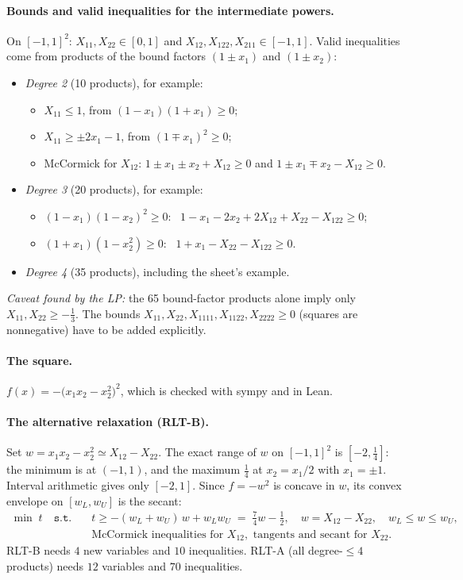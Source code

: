 \documentclass[11pt,fleqn]{article}
\newcommand{\st}{\texttt{s.t.}}
\begin{document}
\paragraph{Bounds and valid inequalities for the intermediate powers.}
On $[-1,1]^2$:
$X_{11}, X_{22} \in [0,1]$ and $X_{12}, X_{122}, X_{211} \in [-1,1]$.
Valid inequalities come from products of the bound factors $(1\pm x_1)$ and $(1\pm x_2)$:
\begin{itemize}
\item \emph{Degree 2} (10 products), for example:
  \begin{itemize}
  \item $X_{11} \le 1$, from $(1-x_1)(1+x_1)\ge0$;
  \item $X_{11} \ge \pm 2x_1 - 1$, from $(1\mp x_1)^2\ge0$;
  \item McCormick for $X_{12}$: $1 \pm x_1 \pm x_2 + X_{12} \ge 0$ and $1 \pm x_1 \mp x_2 - X_{12} \ge 0$.
  \end{itemize}
\item \emph{Degree 3} (20 products), for example:
  \begin{itemize}
  \item $(1-x_1)(1-x_2)^2 \ge 0$: \ $1 - x_1 - 2x_2 + 2X_{12} + X_{22} - X_{122} \ge 0$;
  \item $(1+x_1)(1-x_2^2) \ge 0$: \ $1 + x_1 - X_{22} - X_{122} \ge 0$.
  \end{itemize}
\item \emph{Degree 4} (35 products), including the sheet's example.
\end{itemize}

\emph{Caveat found by the LP:} the 65 bound-factor products alone imply only
$X_{11}, X_{22} \ge -\tfrac13$. The bounds $X_{11}, X_{22}, X_{1111}, X_{1122}, X_{2222} \ge 0$
(squares are nonnegative) have to be added explicitly.

\paragraph{The square.}
$f(x) = -\big(x_1x_2 - x_2^2\big)^2$, which is checked with sympy and in Lean.

\paragraph{The alternative relaxation (RLT-B).}
Set $w = x_1x_2 - x_2^2 \simeq X_{12} - X_{22}$. The exact range of $w$ on $[-1,1]^2$ is
$[-2, \tfrac14]$: the minimum is at $(-1,1)$, and the maximum $\tfrac14$ at $x_2 = x_1/2$
with $x_1 = \pm1$. Interval arithmetic gives only $[-2,1]$. Since $f = -w^2$ is concave in
$w$, its convex envelope on $[w_L,w_U]$ is the secant:
\begin{align*}
  \min\; t \quad\st\quad & t \ge -(w_L+w_U)\,w + w_Lw_U \;=\; \tfrac74 w - \tfrac12,
    \quad w = X_{12} - X_{22}, \quad w_L \le w \le w_U,\\
  & \text{McCormick inequalities for } X_{12}, \text{ tangents and secant for } X_{22}.
\end{align*}
RLT-B needs $4$ new variables and $10$ inequalities. RLT-A (all degree-$\le4$ products) needs
$12$ variables and $70$ inequalities.
\end{document}
